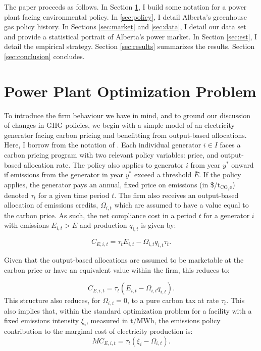\documentclass[12pt]{article}
\newcommand{\coe}{\text{CO$_2$e}}
\begin{document}
The paper proceeds as follows. In Section \ref{sec:opt}, I build some notation for a power plant facing environmental policy. In \ref{sec:policy}, I detail Alberta's greenhouse gas policy history. In Sections \ref{sec:market} and \ref{sec:data}, I detail our data set and provide a statistical portrait of Alberta's power market. In Section \ref{sec:est}, I detail the empirical strategy. Section \ref{sec:results} summarizes the results. Section \ref{sec:conclusion} concludes.

\section{Power Plant Optimization Problem}\label{sec:opt}

To introduce the firm behaviour we have in mind, and to ground our discussion of changes in GHG policies, we begin with a simple model of an electricity generator facing carbon pricing and benefitting from output-based allocations. Here, I borrow from the notation of \cite{brown_carbon_2018}. Each individual generator $i \in I$ faces a carbon pricing program with two relevant policy variables: price, and output-based allocation rate. The policy also applies to generator $i$ from year $y^*$ onward if emissions from the generator in year $y^*$ exceed a threshold $\bar{E}$. If the policy applies, the generator pays an annual, fixed price on emissions (in \$/t$_{\text{CO}_2\text{e}}$) denoted $\tau_t$ for a given time period $t$. The firm also receives an output-based allocation of emissions credits, $\Omega_{i,t}$ which are assumed to have a value equal to the carbon price. As such, the net compliance cost in a period $t$ for a generator $i$ with emissions $E_{i,t}>\bar{E}$ and production $q_{i,t}$ is given by:

\begin{equation}
C_{E,i,t}=\tau_{t}E_{i,t}-\Omega_{i,t}q_{i,t}\tau_{t}.
\end{equation}

\noindent Given that the output-based allocations are assumed to be marketable at the carbon price or have an equivalent value within the firm, this reduces to:

\begin{equation}
C_{E,i,t}=\tau_{t}\left(E_{i,t}-\Omega_{i,t}q_{i,t}\right).
\end{equation}
\noindent This structure also reduces, for $\Omega_{i,t}=0$, to a pure carbon tax at rate $\tau_t$. This also implies that, within the standard optimization problem for a facility with a fixed emissions intensity $\xi_i$, measured in 
t\coe/MWh, the emissions policy contribution to the marginal cost of electricity production is:
\begin{equation}
MC_{E,i,t}=\tau_{t}\left(\xi_{i}-\Omega_{i,t}\right).
\end{equation}
\end{document}
